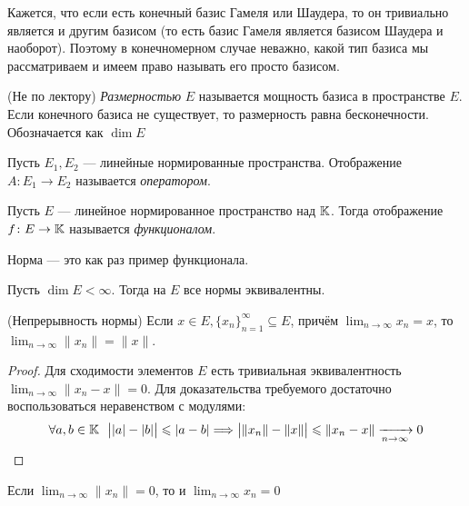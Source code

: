\begin{anote}
	Кажется, что если есть конечный базис Гамеля или Шаудера, то он тривиально является и другим базисом (то есть базис Гамеля является базисом Шаудера и наоборот). Поэтому в конечномерном случае неважно, какой тип базиса мы рассматриваем и имеем право называть его просто базисом.
\end{anote}

\begin{definition} (Не по лектору)
	\textit{Размерностью} $E$ называется мощность базиса в пространстве $E$. Если конечного базиса не существует, то размерность равна бесконечности. Обозначается как $\dim E$
\end{definition}

\begin{definition}
	Пусть $E_1, E_2$ --- линейные нормированные пространства. Отображение $A \colon E_1 \to E_2$ называется \textit{оператором}.
\end{definition}

\begin{definition}
	Пусть $E$ --- линейное нормированное пространство над $\mathbb{K}$. Тогда отображение $f \colon E \to \mathbb{K}$ называется \textit{функционалом}.
\end{definition}

\begin{anote}
	Норма --- это как раз пример функционала.
\end{anote}

\begin{theorem}
	Пусть $\dim E < \infty$. Тогда на $E$ все нормы эквивалентны.
\end{theorem}

\begin{lemma} (Непрерывность нормы)
	Если $x \in E, \{x_n\}_{n = 1}^\infty \subseteq E$, причём $\lim_{n \to \infty} x_n = x$, то $\lim_{n \to \infty} \|x_n\| = \|x\|$.
\end{lemma}

\begin{proof}
	Для сходимости элементов $E$ есть тривиальная эквивалентность \\ $\lim_{n \to \infty} \|x_n - x\| = 0$. Для доказательства требуемого достаточно воспользоваться неравенством с модулями:
	\[
		\forall a, b \in \mathbb{K}\ \ \big||a| - |b|\big| \leqslant |a - b| \Longrightarrow \big|\|x_n\| - \|x\|\big| \leqslant \|x_n - x\| \xrightarrow[n \to \infty]{} 0
	\]
\end{proof}

\begin{corollary}
	Если $\lim_{n \to \infty} \|x_n\| = 0$, то и $\lim_{n \to \infty} x_n = 0$
\end{corollary}

